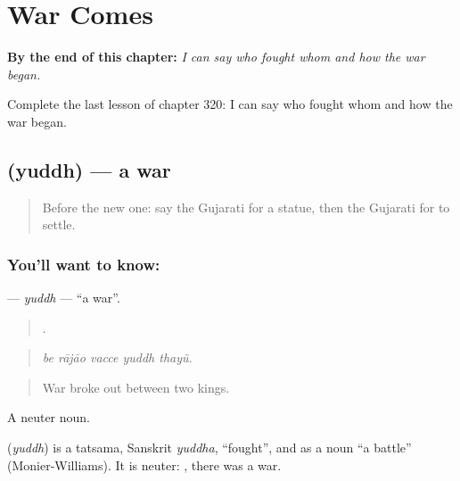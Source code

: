 
\chapter{War Comes}
\label{ch:gu-war-comes}

\begin{chapteropening}
\textbf{By the end of this chapter:} \emph{I can say who fought whom and how the war began.}

Complete the last lesson of chapter 320: I can say who fought whom and how the war began.
\end{chapteropening}

\section[\texorpdfstring{\gu{યુદ્ધ} (yuddh)}{યુદ્ધ (yuddh)}]{ (yuddh) — a war}

\label{lesson:GU-C320-yuddh}



\begin{quote}
Before the new one: say the Gujarati for a statue, then the Gujarati for to settle.
\end{quote}

\subsection*{You'll want to know: }
\textbf{} — \emph{yuddh} — \textquotedblleft{}a war\textquotedblright{}.

\begin{quote}
    .
\end{quote}

\begin{quote}
\emph{be rājāo vacce yuddh thayũ.}
\end{quote}

\begin{quote}
War broke out between two kings.
\end{quote}

A neuter noun.

\begin{cousinweb}
\textbf{} (\emph{yuddh}) is a tatsama, Sanskrit \emph{yuddha}, \textquotedblleft{}fought\textquotedblright{}, and as a noun \textquotedblleft{}a battle\textquotedblright{} (Monier-Williams). It is neuter: \textbf{ }, there was a war.
\end{cousinweb}

